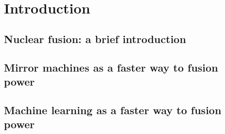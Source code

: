 \graphicspath{{Chapters/Chapter_intro/}}

\chapter{Introduction}
\label{ch:intro}

\section{Nuclear fusion: a brief introduction}

\section{Mirror machines as a faster way to fusion power}

\section{Machine learning as a faster way to fusion power}
